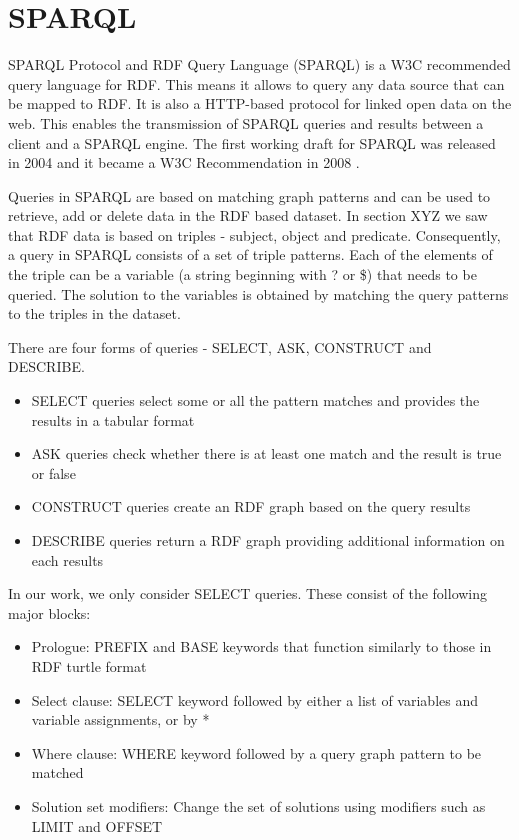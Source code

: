 \documentclass[12 pt, a4paper]{report}
\theoremstyle{definition}
\begin{document}
\section{SPARQL}
SPARQL Protocol and RDF Query Language (SPARQL) is a W3C recommended query language for RDF. This means it allows to query any data source that can be mapped to RDF. It is also a HTTP-based protocol for linked open data on the web. This enables the transmission of SPARQL queries and results between a client and a SPARQL engine. The first working draft for SPARQL was released in 2004 and it became a W3C Recommendation in 2008 \cite{Perez2009}. 

Queries in SPARQL are based on matching graph patterns and can be used to retrieve, add or delete data in the RDF based dataset. In section XYZ we saw that RDF data is based on triples - subject, object and predicate. Consequently, a query in SPARQL consists of a set of triple patterns. Each of the elements of the triple can be a variable (a string beginning with ? or \$) that needs to be queried. The solution to the variables is obtained by matching the query patterns to the triples in the dataset.

There are four forms of queries - SELECT, ASK, CONSTRUCT and DESCRIBE. 
\begin{itemize}
\item SELECT queries select some or all the pattern matches and provides the results in a tabular format
\item ASK queries check whether there is at least one match and the result is true or false
\item CONSTRUCT queries create an RDF graph based on the query results
\item DESCRIBE queries return a RDF graph providing additional information on each results
\end{itemize}

In our work, we only consider SELECT queries. These consist of the following major blocks:
\begin{itemize}
\item Prologue: PREFIX and BASE keywords that function similarly to those in RDF turtle format
\item Select clause: SELECT keyword followed by either a list of variables and variable assignments, or by *
\item Where clause: WHERE keyword followed by a query graph pattern to be matched
\item Solution set modifiers: Change the set of solutions using modifiers such as LIMIT and OFFSET
\end{itemize}
\end{document}
